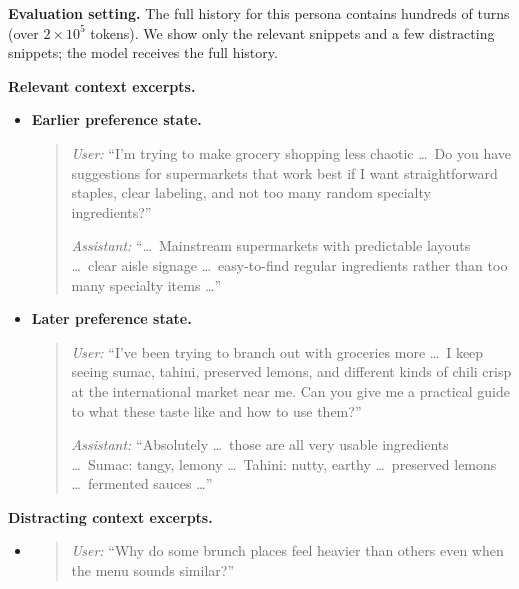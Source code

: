 \documentclass{article}
\begin{document}
\begin{tcolorbox}[
    colback=gray!4,
    colframe=black!75,
    title={Example: PersonaMem-Evo OOD item with temporal preference evolution},
    fonttitle=\bfseries,
    breakable,
    enhanced,
    before skip=4pt,
    after skip=4pt,
    enlargepage flexible,
    pad at break*=1mm
]
\small

\textbf{Evaluation setting.}
The full history for this persona contains hundreds of turns (over $2\times 10^5$ tokens). We show only the relevant snippets and a few distracting snippets; the model receives the full history.

\vspace{0.5em}
\textbf{Relevant context excerpts.}

\begin{itemize}[leftmargin=1.5em]
    \item \textbf{Earlier preference state.}
    \begin{quote}
    \textit{User:} ``I'm trying to make grocery shopping less chaotic \ldots\ Do you have suggestions for supermarkets that work best if I want straightforward staples, clear labeling, and not too many random specialty ingredients?''

    \textit{Assistant:} ``\ldots\ Mainstream supermarkets with predictable layouts \ldots\ clear aisle signage \ldots\ easy-to-find regular ingredients rather than too many specialty items \ldots''
    \end{quote}

    \item \textbf{Later preference state.}
    \begin{quote}
    \textit{User:} ``I've been trying to branch out with groceries more \ldots\ I keep seeing sumac, tahini, preserved lemons, and different kinds of chili crisp at the international market near me. Can you give me a practical guide to what these taste like and how to use them?''

    \textit{Assistant:} ``Absolutely \ldots\ those are all very usable ingredients \ldots\ Sumac: tangy, lemony \ldots\ Tahini: nutty, earthy \ldots\ preserved lemons \ldots\ fermented sauces \ldots''
    \end{quote}
\end{itemize}

\vspace{0.5em}
\textbf{Distracting context excerpts.}

\begin{itemize}[leftmargin=1.5em]
    \item
    \begin{quote}
    \textit{User:} ``Why do some brunch places feel heavier than others even when the menu sounds similar?''
    \end{quote}


\end{itemize}
\end{tcolorbox}
\end{document}

